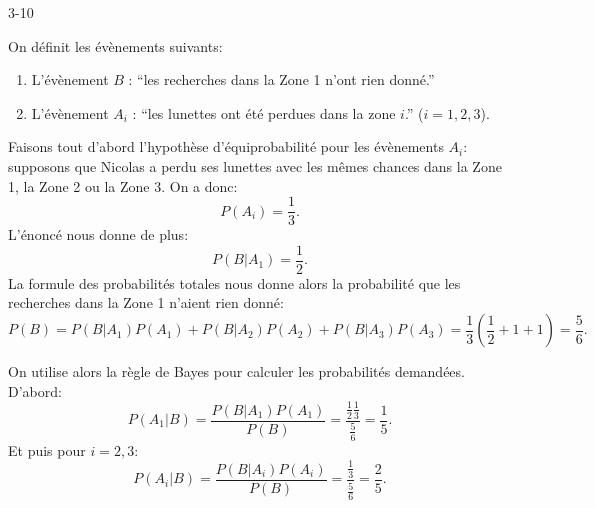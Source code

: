 \begin{corrige}{3-10}

On définit les évènements suivants:
\begin{enumerate}
 \item L'évènement $B$ : ``les recherches dans la Zone 1 n'ont rien donné.''
 \item L'évènement $A_i$ : ``les lunettes ont été perdues dans la zone $i$.'' ($i=1,2,3$).
\end{enumerate}
Faisons tout d'abord l'hypothèse d'équiprobabilité pour les évènements $A_i$: supposons que Nicolas a perdu ses lunettes avec les mêmes chances dans la Zone 1, la Zone 2 ou la Zone 3. On a donc:
\[
 P(A_i) = \frac13.
\]
L'énoncé nous donne de plus:
\[
 P(B | A_1) = \frac12.
\]
La formule des probabilités totales nous donne alors la probabilité que les recherches dans la Zone 1 n'aient rien donné:
\[
 P(B) = P(B | A_1)P(A_1) + P(B |A_2)P(A_2) + P(B|A_3)P(A_3) = \frac13 ( \frac12 + 1 + 1 ) = \frac56.
\]

On utilise alors la règle de Bayes pour calculer les probabilités demandées. D'abord:
\[
 P ( A_1 | B ) = \frac{P(B|A_1)P(A_1)}{P(B)} = \frac{\frac12 \frac13}{\frac56} = \frac15.
\]
Et puis pour $i=2,3$:
\[
 P ( A_i | B ) = \frac{P(B|A_i)P(A_i)}{P(B)} = \frac{\frac13}{\frac56} = \frac25.
\]


\end{corrige}
